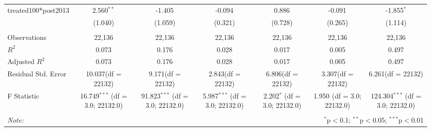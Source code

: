 \documentclass[12pt]{article}
\begin{document}
\begin{table}[!htbp]
\begin{tabular}{@{\extracolsep{5pt}}lcccccc}
 treated100*post2013 & 2.560$^{**}$ & -1.405$^{}$ & -0.094$^{}$ & 0.886$^{}$ & -0.091$^{}$ & -1.855$^{*}$ \\
  & (1.040) & (1.059) & (0.321) & (0.728) & (0.265) & (1.114) \\
\hline \\[-1.8ex]
 Observations & 22,136 & 22,136 & 22,136 & 22,136 & 22,136 & 22,136 \\
 $R^2$ & 0.073 & 0.176 & 0.028 & 0.017 & 0.005 & 0.497 \\
 Adjusted $R^2$ & 0.073 & 0.176 & 0.028 & 0.017 & 0.005 & 0.497 \\
 Residual Std. Error & 10.037(df = 22132) & 9.171(df = 22132) & 2.843(df = 22132) & 6.806(df = 22132) & 3.307(df = 22132) & 6.261(df = 22132)  \\
 F Statistic & 16.749$^{***}$ (df = 3.0; 22132.0) & 91.823$^{***}$ (df = 3.0; 22132.0) & 5.987$^{***}$ (df = 3.0; 22132.0) & 2.202$^{*}$ (df = 3.0; 22132.0) & 1.950$^{}$ (df = 3.0; 22132.0) & 124.304$^{***}$ (df = 3.0; 22132.0) \\
\hline
\hline \\[-1.8ex]
\textit{Note:} & \multicolumn{6}{r}{$^{*}$p$<$0.1; $^{**}$p$<$0.05; $^{***}$p$<$0.01} \\
\end{tabular}
\end{table}
\end{document}
